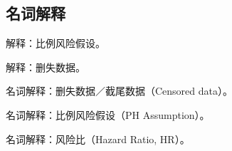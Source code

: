 \par\addvspace{8pt}\noindent\begin{minipage}{\linewidth}

\subsection{名词解释}


解释：比例风险假设。



\end{minipage}\par\vspace{5pt}

\par\addvspace{8pt}\noindent\begin{minipage}{\linewidth}


解释：删失数据。



\end{minipage}\par\vspace{5pt}

\par\addvspace{8pt}\noindent\begin{minipage}{\linewidth}


名词解释：删失数据／截尾数据（Censored data）。



\end{minipage}\par\vspace{5pt}

\par\addvspace{8pt}\noindent\begin{minipage}{\linewidth}


名词解释：比例风险假设（PH Assumption）。



\end{minipage}\par\vspace{5pt}

\par\addvspace{8pt}\noindent\begin{minipage}{\linewidth}


名词解释：风险比（Hazard Ratio, HR）。



\end{minipage}\par\vspace{5pt}

